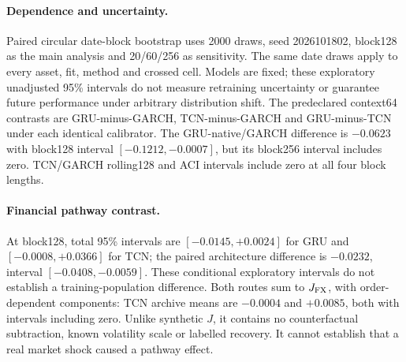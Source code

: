 \documentclass{article}
\begin{document}
\paragraph{Dependence and uncertainty.}
Paired circular date-block bootstrap uses 2000 draws, seed 2026101802,
block128 as the main analysis and 20/60/256 as sensitivity. The same date
draws apply to every asset, fit, method and crossed cell. Models are fixed;
these exploratory unadjusted 95\% intervals do not measure retraining
uncertainty or guarantee future performance under arbitrary distribution
shift. The predeclared context64 contrasts are GRU-minus-GARCH,
TCN-minus-GARCH and GRU-minus-TCN under each identical calibrator.
The GRU-native/GARCH difference is $-0.0623$ with block128 interval
$[-0.1212,-0.0007]$, but its block256 interval includes zero. TCN/GARCH
rolling128 and ACI intervals include zero at all four block lengths.

\paragraph{Financial pathway contrast.}
\begin{center}
\FXMechanismReadout
\end{center}

\noindent At block128, total 95\% intervals are $[-0.0145,+0.0024]$ for GRU
and $[-0.0008,+0.0366]$ for TCN; the paired architecture difference is
$-0.0232$, interval $[-0.0408,-0.0059]$. These conditional exploratory
intervals do not establish a training-population difference.
Both routes sum to $J_{\rm FX}$, with order-dependent components:
TCN archive means are $-0.0004$ and $+0.0085$, both with intervals including zero. Unlike synthetic $J$, it contains no
counterfactual subtraction, known volatility scale or labelled recovery.
It cannot establish that a real market shock caused a pathway effect.
\end{document}
